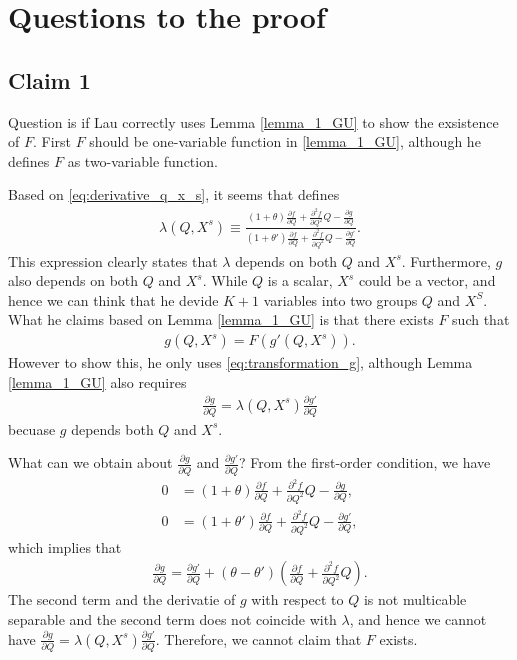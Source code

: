 \documentclass[11pt, a4paper]{article}
\theoremstyle{remark}
\begin{document}
\section{Questions to the proof}

\subsection{Claim 1}

Question is if Lau correctly uses Lemma \ref{lemma_1_GU} to show the exsistence of $F$.
First $F$ should be one-variable function in  \ref{lemma_1_GU}, although he defines $F$ as two-variable function.

Based on \eqref{eq:derivative_q_x_s}, it seems that \citet{lau1982identifying} defines
\begin{align}
    \lambda(Q, X^{s}) \equiv \frac{(1+\theta)\frac{\partial f}{\partial Q} + \frac{\partial^2 f}{\partial Q^2}Q - \frac{\partial g}{\partial Q}}{(1+\theta')\frac{\partial f}{\partial Q} + \frac{\partial^2 f}{\partial Q^2}Q - \frac{\partial g'}{\partial Q}}.
\end{align}
This expression clearly states that $\lambda$ depends on both $Q$ and $X^{s}$.
Furthermore, $g$ also depends on both $Q$ and $X^{s}$.
While $Q$ is a scalar, $X^{s}$ could be a vector, and hence we can think that he devide $K+1$ variables into two groups $Q$ and $X^{S}$.
What he claims based on Lemma \ref{lemma_1_GU} is that there exists $F$ such that
\begin{align}
    g(Q,X^{s}) = F(g'(Q,X^{s})).
\end{align}
However to show this, he only uses \eqref{eq:transformation_g}, although Lemma \ref{lemma_1_GU} also requires 
\begin{align}
    \frac{\partial g}{\partial Q} = \lambda(Q,X^{s}) \frac{\partial g'}{\partial Q}
\end{align}
becuase $g$ depends both $Q$ and $X^{s}$.

What can we obtain about $\frac{\partial g}{\partial Q}$ and $\frac{\partial g'}{\partial Q}$?
From the first-order condition, we have
\begin{align}
    0 &= (1+\theta)\frac{\partial f}{\partial Q} + \frac{\partial^2 f}{\partial Q^2}Q - \frac{\partial g}{\partial Q},\\
    0 &= (1+\theta')\frac{\partial f}{\partial Q} + \frac{\partial^2 f}{\partial Q^2}Q - \frac{\partial g'}{\partial Q},
\end{align}
which implies that 
\begin{align}
    \frac{\partial g}{\partial Q} = \frac{\partial g'}{\partial Q} + (\theta - \theta') \left(\frac{\partial f}{\partial Q} + \frac{\partial^2 f}{\partial Q^2}Q \right).
\end{align}
The second term and the derivatie of $g$ with respect to $Q$ is not multicable separable and the second term does not coincide with $\lambda$, and hence we cannot have $\frac{\partial g}{\partial Q} = \lambda(Q,X^{s}) \frac{\partial g'}{\partial Q}$.
Therefore, we cannot claim that $F$ exists.
\end{document}
